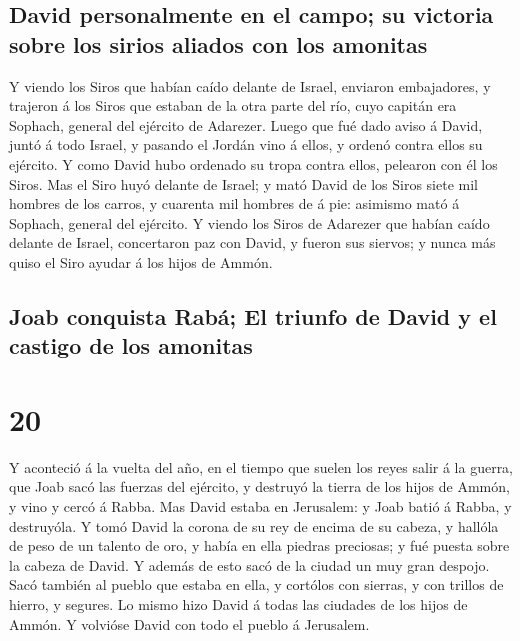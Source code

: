 \hypertarget{david-personalmente-en-el-campo-su-victoria-sobre-los-sirios-aliados-con-los-amonitas}{%
\subsection{David personalmente en el campo; su victoria sobre los
sirios aliados con los
amonitas}\label{david-personalmente-en-el-campo-su-victoria-sobre-los-sirios-aliados-con-los-amonitas}}

 Y viendo los Siros que habían caído delante de Israel,
enviaron embajadores, y trajeron á los Siros que estaban de la otra
parte del río, cuyo capitán era Sophach, general del ejército de
Adarezer.  Luego que fué dado aviso á David, juntó á todo
Israel, y pasando el Jordán vino á ellos, y ordenó contra ellos su
ejército. Y como David hubo ordenado su tropa contra ellos, pelearon con
él los Siros.  Mas el Siro huyó delante de Israel; y mató
David de los Siros siete mil hombres de los carros, y cuarenta mil
hombres de á pie: asimismo mató á Sophach, general del ejército.
 Y viendo los Siros de Adarezer que habían caído delante
de Israel, concertaron paz con David, y fueron sus siervos; y nunca más
quiso el Siro ayudar á los hijos de Ammón.

\hypertarget{joab-conquista-rabuxe1-el-triunfo-de-david-y-el-castigo-de-los-amonitas}{%
\subsection{Joab conquista Rabá; El triunfo de David y el castigo de los
amonitas}\label{joab-conquista-rabuxe1-el-triunfo-de-david-y-el-castigo-de-los-amonitas}}

\hypertarget{section-13-20}{%
\section{20}\label{section-13-20}}

 Y aconteció á la vuelta del año, en el tiempo que suelen
los reyes salir á la guerra, que Joab sacó las fuerzas del ejército, y
destruyó la tierra de los hijos de Ammón, y vino y cercó á Rabba. Mas
David estaba en Jerusalem: y Joab batió á Rabba, y destruyóla.
 Y tomó David la corona de su rey de encima de su cabeza,
y hallóla de peso de un talento de oro, y había en ella piedras
preciosas; y fué puesta sobre la cabeza de David. Y además de esto sacó
de la ciudad un muy gran despojo.  Sacó también al pueblo
que estaba en ella, y cortólos con sierras, y con trillos de hierro, y
segures. Lo mismo hizo David á todas las ciudades de los hijos de Ammón.
Y volvióse David con todo el pueblo á Jerusalem.

